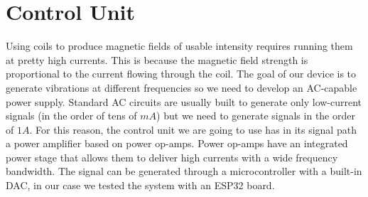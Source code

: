 \section{Control Unit}
Using coils to produce magnetic fields of usable intensity requires running them at pretty high currents.
This is because the magnetic field strength is proportional to the current flowing through the coil.
The goal of our device is to generate vibrations at different frequencies so we need to develop an AC-capable power supply.
Standard AC circuits are usually built to generate only low-current signals (in the order of tens of $mA$) but we need to generate signals in the order of $1A$.
For this reason, the control unit we are going to use has in its signal path a power amplifier based on power op-amps. Power op-amps have an integrated power stage that allows them to deliver high currents with a wide frequency bandwidth.
The signal can be generated through a microcontroller with a built-in DAC, in our case we tested the system with an ESP32 board.